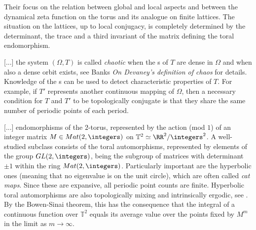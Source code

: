 {\begin{description}
\end{description}


Their focus on the relation between global and local aspects and between the
dynamical zeta function on the torus and its analogue on finite lattices. The
situation on the lattices, up to local conjugacy, is completely determined by
the determinant, the trace and a third invariant of the matrix defining the toral
endomorphism.



[...] the                                                     \toCB
system $(\varOmega,T)$ is called \emph{chaotic} when the {\po}s of $T$ are dense in $\varOmega$ and when also a dense orbit
exists, see Banks \etal{}
\textit{On Devaney's definition of chaos} for details.
Knowledge of the {\po}s can be used to detect characteristic properties of $T$. For
example, if $T'$ represents another continuous mapping of $\varOmega$,
then a necessary condition for $T$ and $T'$ to be topologically
conjugate is that they share the same number of periodic points of
each period.

[...] endomorphisms of the $2$-torus, represented by the action (mod $1$)
of an integer matrix $M\in{Mat} (2,\integers)$ on $\mathbb{T}^2 \simeq \RR^2/\integers^2$. A
well-studied subclass consists of the toral automorphisms, represented by
elements of the group $GL (2,\integers)$, being the subgroup of matrices with
determinant $\pm 1$ within the ring ${Mat} (2,\integers)$. Particularly
important are the hyperbolic ones (meaning that no eigenvalue is on the
unit circle), which are often called \emph{cat maps}.  Since these are
expansive, all periodic point counts are finite.  Hyperbolic toral
automorphisms are also topologically mixing and intrinsically ergodic,
see . By the Bowen-Sinai theorem, this has the
consequence that the integral of a continuous function over $\mathbb{T}^2$
equals its average value over the points fixed by $M^m$ in the limit as
$m \rightarrow \infty$.

}
